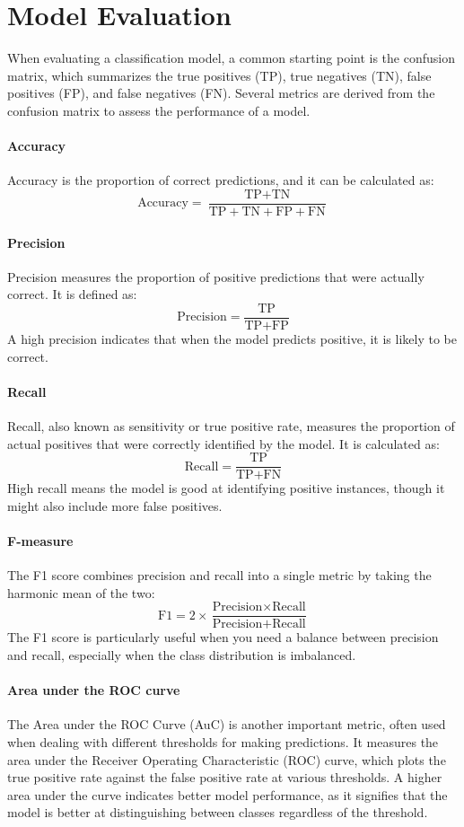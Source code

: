 \section{Model Evaluation}

When evaluating a classification model, a common starting point is the confusion matrix, which summarizes the true positives (TP), true negatives (TN), false positives (FP), and false negatives (FN). 
Several metrics are derived from the confusion matrix to assess the performance of a model.

\paragraph*{Accuracy}
Accuracy is the proportion of correct predictions, and it can be calculated as:
\[\text{Accuracy} = \frac{\text{TP} + \text{TN}}{\text{TP} + \text{TN} + \text{FP} + \text{FN}}\]

\paragraph*{Precision}
Precision measures the proportion of positive predictions that were actually correct. 
It is defined as:
\[\text{Precision} = \frac{\text{TP}}{\text{TP} + \text{FP}}\]
A high precision indicates that when the model predicts positive, it is likely to be correct.

\paragraph*{Recall}
Recall, also known as sensitivity or true positive rate, measures the proportion of actual positives that were correctly identified by the model. 
It is calculated as:
\[\text{Recall} = \frac{\text{TP}}{\text{TP} + \text{FN}}\]
High recall means the model is good at identifying positive instances, though it might also include more false positives.

\paragraph*{F-measure}
The F1 score combines precision and recall into a single metric by taking the harmonic mean of the two:
\[\text{F1} = 2 \times \frac{\text{Precision} \times \text{Recall}}{\text{Precision} + \text{Recall}}\]
The F1 score is particularly useful when you need a balance between precision and recall, especially when the class distribution is imbalanced.

\paragraph*{Area under the ROC curve}
The Area under the ROC Curve (AuC) is another important metric, often used when dealing with different thresholds for making predictions. 
It measures the area under the Receiver Operating Characteristic (ROC) curve, which plots the true positive rate against the false positive rate at various thresholds. 
A higher area under the curve indicates better model performance, as it signifies that the model is better at distinguishing between classes regardless of the threshold.

